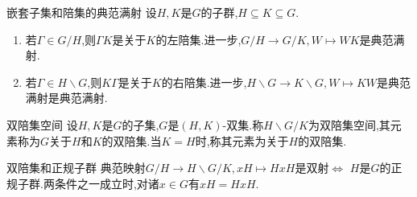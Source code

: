 \begin{proposition}{嵌套子集和陪集的典范满射}{}
	设$H,K$是$G$的子群,$H\subseteq K\subseteq G$.
	\begin{enumerate}
		\item 若$\Gamma\in G/H$,则$\Gamma K$是关于$K$的左陪集.进一步,$G/H\to G/K,W\mapsto WK$是典范满射.
		\item 若$\Gamma\in H\backslash G$,则$K\Gamma$是关于$K$的右陪集.进一步,$H\backslash G\to K\backslash G,W\mapsto KW$是典范满射是典范满射.
	\end{enumerate}
\end{proposition}

\begin{definition}{双陪集空间}{}
	设$H,K$是$G$的子集,$G$是$\left(H,K\right)$-双集.称$H\backslash G/K$为双陪集空间,其元素称为$G$关于$H$和$K$的双陪集.当$K=H$时,称其元素为关于$H$的双陪集.
\end{definition}

\begin{proposition}{双陪集和正规子群}{}
	典范映射$G/H\to H\backslash G/K,xH\mapsto HxH$是双射$\iff$ $H$是$G$的正规子群.两条件之一成立时,对诸$x\in G$有$xH=HxH$.
\end{proposition}





























